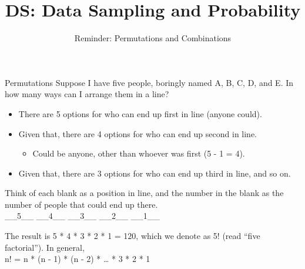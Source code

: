 \documentclass[aspectratio=169]{../latex_main/tntbeamer}  %
\title[Permutations]{DS: Data Sampling and Probability}
\subtitle{Reminder: Permutations and Combinations}
\begin{document}
	
	\maketitle
	

	\begin{frame}{Permutations}
	    Suppose I have five people, boringly named A, B, C, D, and E. In how many ways can I arrange them in a line?
	    \begin{itemize}
	        \item There are 5 options for who can end up first in line (anyone could).
	        \item Given that, there are 4 options for who can end up second in line.
	        \begin{itemize}
	            \item Could be anyone, other than whoever was first (5 - 1 = 4).
	        \end{itemize}
	        \item Given that, there are 3 options for who can end up third in line, and so on.
	    \end{itemize}
	    	       
	       Think of each blank as a position in line, and the number in the blank as the number of people that could end up there.\\
	       
	       \_\_5\_\_ \hspace{2cm}		\_\_4\_\_ \hspace{2cm}		\_\_3\_\_ \hspace{2cm}		\_\_2\_\_	 \hspace{2cm}	\_\_1\_\_

        The result is 5 * 4 * 3 * 2 * 1 = 120, which we denote as 5! (read “five factorial”). In general,\\
        \hspace{4cm} n! = n * (n - 1) * (n - 2) * … * 3 * 2 * 1


	\end{frame}
	
\end{document}

